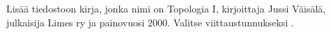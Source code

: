     \begin{harj}
        Lisää tiedostoon  kirja, jonka nimi on Topologia I, kirjoittaja Jussi Väisälä, julkaisija Limes ry ja painovuosi 2000. Valitse viittaustunnukseksi .
    \end{harj}
